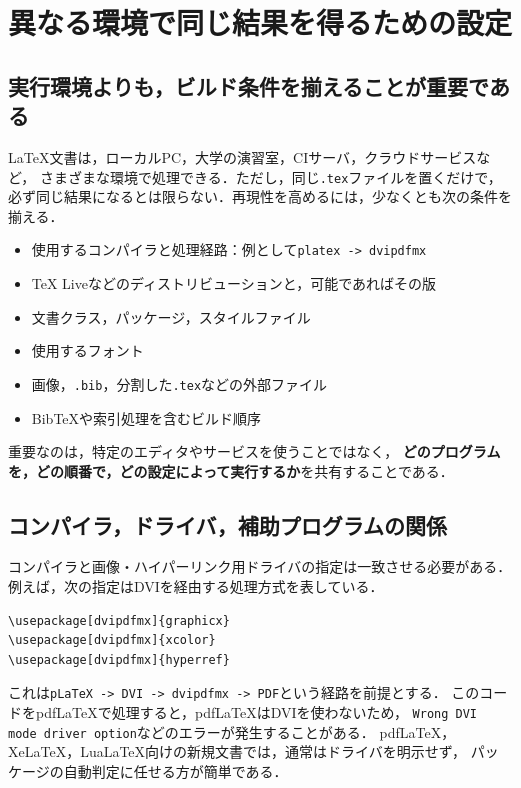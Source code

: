 \documentclass[a4paper,11pt]{jsarticle}
\newcommand{\code}[1]{\texttt{#1}}
\begin{document}
\section{異なる環境で同じ結果を得るための設定}

\subsection{実行環境よりも，ビルド条件を揃えることが重要である}

LaTeX文書は，ローカルPC，大学の演習室，CIサーバ，クラウドサービスなど，
さまざまな環境で処理できる．ただし，同じ\code{.tex}ファイルを置くだけで，
必ず同じ結果になるとは限らない．再現性を高めるには，少なくとも次の条件を揃える．

\begin{itemize}
  \item 使用するコンパイラと処理経路：例として\code{platex -> dvipdfmx}
  \item TeX Liveなどのディストリビューションと，可能であればその版
  \item 文書クラス，パッケージ，スタイルファイル
  \item 使用するフォント
  \item 画像，\code{.bib}，分割した\code{.tex}などの外部ファイル
  \item BibTeXや索引処理を含むビルド順序
\end{itemize}

重要なのは，特定のエディタやサービスを使うことではなく，
\textbf{どのプログラムを，どの順番で，どの設定によって実行するか}を共有することである．

\subsection{コンパイラ，ドライバ，補助プログラムの関係}

コンパイラと画像・ハイパーリンク用ドライバの指定は一致させる必要がある．
例えば，次の指定はDVIを経由する処理方式を表している．

\begin{lstlisting}[language={[LaTeX]TeX}]
\usepackage[dvipdfmx]{graphicx}
\usepackage[dvipdfmx]{xcolor}
\usepackage[dvipdfmx]{hyperref}
\end{lstlisting}

これは\code{pLaTeX -> DVI -> dvipdfmx -> PDF}という経路を前提とする．
このコードをpdfLaTeXで処理すると，pdfLaTeXはDVIを使わないため，
\code{Wrong DVI mode driver option}などのエラーが発生することがある．
pdfLaTeX，XeLaTeX，LuaLaTeX向けの新規文書では，通常はドライバを明示せず，
パッケージの自動判定に任せる方が簡単である．
\end{document}
